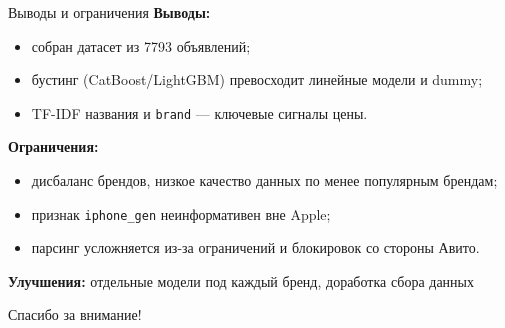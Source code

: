 \documentclass[aspectratio=169,12pt]{beamer}
\begin{document}
\begin{frame}{Выводы и ограничения}
  \textbf{Выводы:}
  \begin{itemize}
    \item собран датасет из 7793 объявлений;
    \item бустинг (CatBoost/LightGBM) превосходит линейные модели и dummy;
    \item TF-IDF названия и \texttt{brand} --- ключевые сигналы цены.
  \end{itemize}

  \vspace{0.5em}
  \textbf{Ограничения:}
  \begin{itemize}
    \item дисбаланс брендов, низкое качество данных по менее популярным брендам;
    \item признак \texttt{iphone\_gen} неинформативен вне Apple;
    \item парсинг усложняется из-за ограничений и блокировок со стороны Авито.
  \end{itemize}

  \vspace{0.5em}
  \textbf{Улучшения:} отдельные модели под каждый бренд, доработка сбора данных
\end{frame}

\begin{frame}
  \centering
  \Large Спасибо за внимание!

\end{frame}
\end{document}

